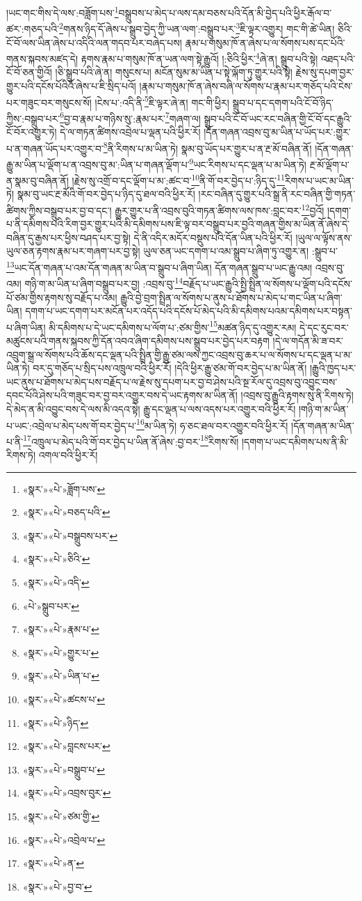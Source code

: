 །ཡང་གང་གིས་དེ་ལས་:བཟློག་པས་\footnote{«སྣར་»«པེ་»ཟློག་པས་}བསྒྲུབས་པ་མེད་པ་ལས་དམ་བཅས་པའི་དོན་མི་བྱེད་པའི་ཕྱིར་རྒོལ་བ་ཚར་:གཅད་པའི་\footnote{«སྣར་»«པེ་»བཅད་པའི་}གནས་ཉིད་དོ་ཞེས་པ་སྒྲུབ་བྱེད་ཀྱི་ཡན་ལག་:བསྒྲུབ་པར་\footnote{«སྣར་»«པེ་»བསྒྲུབས་པར་}ཇི་ལྟར་འགྱུར། གང་གི་ཚེ་ཡིན། ཅིའི་ངོ་བོ་ལས་ཡིན་ཞེས་པ་འདིའི་ལན་གདབ་པར་བཞེད་པས། རྣམ་པ་གསུམ་ཁོ་ན་ཞེས་པ་ལ་སོགས་པས་དང་པོའི་གནས་སྐབས་མཛད་དེ། རྟགས་རྣམ་པ་གསུམ་ཁོ་ན་ཡན་ལག་སྟེ་རྒྱུའོ། །:ཅིའི་ཕྱིར་\footnote{«སྣར་»«པེ་»ཅིའི་}ཞེ་ན། སྒྲུབ་པའི་སྟེ། འཐད་པའི་ངོ་བོ་ཅན་གྱིའོ། །ཅི་སྒྲུབ་པའི་ཞེ་ན། གསུངས་པ། མངོན་སུམ་མ་ཡིན་པ་སྟེ་ལྐོག་ཏུ་གྱུར་པའི་སྟེ། རྗེས་སུ་དཔག་བྱར་གྱུར་པའི་དངོས་པོའིའོ་ཞེས་པ་ཇི་སྲིད་པའོ། །རྣམ་པ་གསུམ་ཁོ་ན་ཞེས་བཞི་ལ་སོགས་པ་རྣམ་པར་གཅོད་པའི་ངེས་པར་གཟུང་བར་གསུངས་སོ། །ངེས་པ་:འདི་ནི་\footnote{«སྣར་»«པེ་»འདི་}ཇི་ལྟར་ཞེ་ན། གང་གི་ཕྱིར། སྒྲུབ་པ་དང་དགག་པའི་ངོ་བོ་ཉིད་ཀྱིས་:བསྒྲུབ་པར་\footnote{«པེ་»སྒྲུབ་པར་}བྱ་བ་རྣམ་པ་གཉིས་སུ་:རྣམ་པར་\footnote{«སྣར་»«པེ་»རྣམ་པ་}གཞག་ལ། སྒྲུབ་པའི་ངོ་བོ་ཡང་རང་བཞིན་གྱི་ངོ་བོ་དང་རྒྱུའི་ངོ་བོར་འགྱུར་ཏེ། དེ་ལ་གཏན་ཚིགས་འབྲེལ་པ་ལྡན་པའི་ཕྱིར་རོ། །དོན་གཞན་འབྲས་བུ་མ་ཡིན་པ་ཡོད་པར་:གྱུར་པ་ན་གཞན་ཡོད་པར་འགྱུར་བ་\footnote{«སྣར་»«པེ་»གྱུར་པ་}ནི་རིགས་པ་མ་ཡིན་ཏེ། སྣམ་བུ་ཡོད་པར་གྱུར་པ་ན་རྔ་མོ་བཞིན་ནོ། །དོན་གཞན་རྒྱུ་མ་ཡིན་པ་ལྡོག་པ་ན་འབྲས་བུ་མ་:ཡིན་པ་གཞན་ལྡོག་པ་\footnote{«སྣར་»«པེ་»ཡིན་པ་}ཡང་རིགས་པ་དང་ལྡན་པ་མ་ཡིན་ཏེ། རྔ་མོ་ལྡོག་པ་ན་སྣམ་བུ་བཞིན་ནོ། །རྗེས་སུ་འགྲོ་བ་དང་ལྡོག་པ་མ་:ཚང་བ་\footnote{«སྣར་»«པེ་»ཚངས་པ་}ནི་གོ་བར་བྱེད་པ་:ཉིད་དུ་\footnote{«སྣར་»«པེ་»ཉིད་}རིགས་པ་ཡང་མ་ཡིན་ཏེ། སྣམ་བུ་ཡང་རྔ་མོའི་གོ་བར་བྱེད་པ་ཉིད་དུ་ཐལ་བའི་ཕྱིར་རོ། །རང་བཞིན་དུ་གྱུར་པའི་སྒྲ་ནི་རང་བཞིན་གྱི་གཏན་ཚིགས་ཀྱིས་བསྒྲུབ་པར་བྱ་བ་དང་། རྒྱུར་གྱུར་པ་ནི་འབྲས་བུའི་གཏན་ཚིགས་ལས་ཁས་:བླང་བར་\footnote{«སྣར་»«པེ་»བླངས་པར་}བྱའོ། །དགག་པ་ནི་དམིགས་པའི་རིག་བྱར་གྱུར་པའི་མི་དམིགས་པས་ཇི་ལྟ་བར་བསྒྲུབ་པར་བྱའི་གཞན་གྱིས་མ་ཡིན་ནོ་ཞེས་དེ་བཞིན་དུ་རྒྱས་པར་ཕྱིས་བཤད་པར་བྱ་སྟེ། དེ་ནི་འདིར་མདོར་བསྡུས་པའི་དོན་ཡིན་པའི་ཕྱིར་རོ། །ཡུལ་ལ་ལྟོས་ནས་ཡུལ་ཅན་རྟགས་རྣམ་པར་གཞག་པར་བྱ་སྟེ། ཡུལ་ཅན་ཡང་དགག་པ་འམ་སྒྲུབ་པ་ཞིག་ཏུ་འགྱུར་ན། :སྒྲུབ་པ་\footnote{«སྣར་»«པེ་»བསྒྲུབ་པ་}ཡང་དོན་གཞན་པ་འམ་དོན་གཞན་མ་ཡིན་བ་སྒྲུབ་པ་ཞིག་ཡིན། དོན་གཞན་སྒྲུབ་པ་ཡང་རྒྱུ་འམ། འབྲས་བུ་འམ། གཉི་ག་མ་ཡིན་པ་ཞིག་བསྒྲུབ་པར་བྱ། :འབྲས་བུ་\footnote{«སྣར་»«པེ་»འབྲས་བུར་}བརྗོད་པ་ཡང་རྒྱུའི་སྤྱི་སྤྲིན་ལ་སོགས་པ་ལྡོག་པའི་དངོས་པོ་ཙམ་གྱིས་རྟགས་སུ་བརྗོད་པ་འམ། རྒྱུའི་བྱེ་བྲག་སྤྲིན་ལ་སོགས་པ་ནུས་པ་ཐོགས་པ་མེད་པ་གང་ཡིན་པ་ཞིག་ཡིན། དགག་པ་ཡང་དགག་པར་མངོན་པར་འདོད་པའི་དངོས་པོ་མེད་པའི་མི་དམིགས་པའམ་དམིགས་པར་བསྟན་པ་ཞིག་ཡིན། མི་དམིགས་པ་དེ་ཡང་དམིགས་པ་ལོག་པ་:ཙམ་གྱིས་\footnote{«སྣར་»«པེ་»ཙམ་གྱི་}མཚན་ཉིད་དུ་འགྱུར་རམ། དེ་དང་རུང་བར་མཚུངས་པའི་གནས་སྐབས་ཀྱི་དོན་འབའ་ཞིག་དམིགས་པས་སྒྲུབ་པར་བྱེད་པར་བརྟག །དེ་ལ་གདོན་མི་ཟ་བར་འབྲུག་སྒྲ་ལ་སོགས་པའི་ཆོས་དང་ལྡན་པའི་སྤྲིན་གྱི་རྒྱུ་ཙམ་ལས་ཀྱང་འབྲས་བུ་ཆར་པ་ལ་སོགས་པ་དང་ལྡན་པ་མ་ཡིན་ཏེ། བར་དུ་གཅོད་པ་སྲིད་པས་འཁྲུལ་བའི་ཕྱིར་རོ། །དེའི་ཕྱིར་རྒྱུ་ཙམ་གོ་བར་བྱེད་པ་མ་ཡིན་ནོ། །རྒྱུའི་ཁྱད་པར་ཡང་ནུས་པ་ཐོགས་པ་མེད་པས་བརྗོད་པ་ལ་རྗེས་སུ་དཔག་པར་བྱ་བ་ཤེས་པའི་སྔ་རོལ་དུ་འབྲས་བུ་འབྱུང་བས་དབང་པོའི་ཤེས་པའི་གཟུང་བར་བྱ་བར་འགྱུར་བས་དེ་ཡང་རྟགས་མ་ཡིན་ནོ། །འབྲས་བུ་རྒྱུའི་རྟགས་སུ་ནི་རིགས་ཏེ། དེ་མེད་ན་མི་འབྱུང་བས་དེ་ལས་མི་འདའ་སྟེ། རྒྱུ་དང་ལྡན་པ་ལས་འདས་པར་འགྱུར་བའི་ཕྱིར་རོ། །གཉི་ག་མ་ཡིན་པ་ཡང་:འབྲེལ་པ་མེད་པས་གོ་བར་བྱེད་པ་\footnote{«སྣར་»«པེ་»འབྲེལ་པ་}མ་ཡིན་ཏེ། ཧ་ཅང་ཐལ་བར་འགྱུར་བའི་ཕྱིར་རོ། །དོན་གཞན་མ་ཡིན་པ་ནི་\footnote{«སྣར་»«པེ་»ན་}འཁྲུལ་པ་མེད་པའི་གོ་བར་བྱེད་པ་ཡིན་ནོ་ཞེས་:བྱ་བར་\footnote{«སྣར་»«པེ་»བྱ་བ་}རིགས་སོ། །དགག་པ་ཡང་དམིགས་པས་ནི་མི་རིགས་ཏེ། འགལ་བའི་ཕྱིར་རོ། 